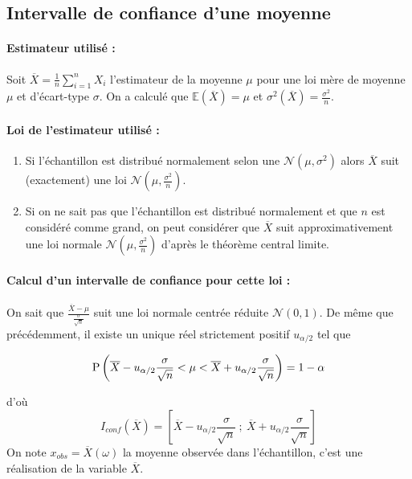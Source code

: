 \subsection{Intervalle de confiance d'une moyenne}
\paragraph{Estimateur utilisé :} Soit $\overline{X}=\frac{1}{n}\sum_{i=1}^n X_i$ l'estimateur de la moyenne $\mu$ pour une loi mère de moyenne $\mu$ et d'écart-type $\sigma$. On a calculé que $\mathbb{E}(\overline{X})=\mu$
et $\sigma^2(\overline{X}) = \frac{\sigma^2}{n}$.

\paragraph{Loi de l'estimateur utilisé :}  

\begin{enumerate}
	\item Si l'échantillon est distribué normalement selon une $\mathcal{N}\left(\mu,\sigma^2\right)$ alors $\overline{X}$ suit (exactement) une loi $\mathcal{N}\left(\mu,\frac{\sigma^2}{n}\right)$.
	\item Si on ne sait pas que l'échantillon est distribué normalement et que $n$ est considéré comme grand, on peut considérer que $\overline{X}$ suit approximativement une loi normale $\mathcal{N}\left(\mu,\frac{\sigma^2}{n}\right)$ d'après le théorème central limite.
\end{enumerate}


\paragraph{Calcul d'un intervalle de confiance pour cette loi :}  On sait que $\frac{\overline{X}-\mu}{\frac{\sigma}{\sqrt{n}}}$ suit une loi normale centrée réduite $\mathcal{N}(0,1)$. De même que précédemment, il existe un unique réel strictement positif $u_{\alpha/2}$ tel que 

$$\operatorname{P}\left(\overline{X}-u_{\alpha/2} \frac{\sigma}{\sqrt{n}} < \mu < \overline{X} + u_{\alpha/2} \frac{\sigma}{\sqrt{n}}\right) = 1-\alpha$$

d'où $$I_{conf}(\overline{X})=\left[\overline{X}-u_{\alpha/2} \frac{\sigma}{\sqrt{n}}~;~\overline{X} + u_{\alpha/2} \frac{\sigma}{\sqrt{n}} \right]$$
On note $x_{obs}=\overline{X}(\omega)$ la moyenne observée dans l'échantillon, c'est une réalisation de la variable $\overline{X}$.

